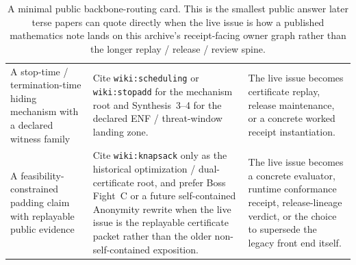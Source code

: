 \documentclass[11pt]{article}
\begin{document}
\begin{table}[t]
\begin{tabularx}{\linewidth}{@{}L Y Y@{}}
A stop-time / termination-time hiding mechanism with a declared witness family & Cite \texttt{wiki:scheduling} or \texttt{wiki:stopadd} for the mechanism root and Synthesis~3--4 for the declared ENF / threat-window landing zone. & The live issue becomes certificate replay, release maintenance, or a concrete worked receipt instantiation. \\
A feasibility-constrained padding claim with replayable public evidence & Cite \texttt{wiki:knapsack} only as the historical optimization / dual-certificate root, and prefer Boss Fight~C or a future self-contained Anonymity rewrite when the live issue is the replayable certificate packet rather than the older non-self-contained exposition. & The live issue becomes a concrete evaluator, runtime conformance receipt, release-lineage verdict, or the choice to supersede the legacy front end itself. \\
\bottomrule
\end{tabularx}
\caption{A minimal public backbone-routing card. This is the smallest public answer later terse papers can quote directly when the live issue is how a published mathematics note lands on this archive's receipt-facing owner graph rather than the longer replay / release / review spine.}
\label{tab:mathcrosswalk-mincard}
\end{table}
\end{document}
